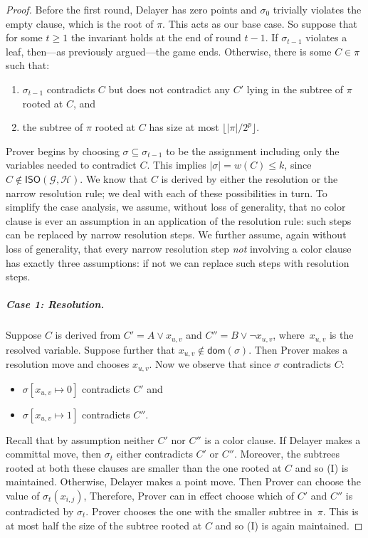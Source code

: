 \documentclass[a4paper,english, thm-restate]{lipics-v2021}
\newcommand{\graphG}{\mathcal{G}}
\newcommand{\graphH}{\mathcal{H}}
\newcommand{\dom}{\mathsf{dom}}
\newcommand{\ISO}{\mathsf{ISO}(\graphG, \graphH)}
\begin{document}
\begin{proof}
Before the first round, Delayer has zero points and $\sigma_0$ trivially violates the empty clause, which is the root of $\pi$. This acts as our base case.
So suppose that for some $t \ge 1$ the invariant holds at the end of round $t-1$. If $\sigma_{t-1}$ violates a leaf, then---as previously argued---the game ends. Otherwise, there is some $C \in \pi$ such that:
\begin{enumerate}
\item $\sigma_{t-1}$ contradicts $C$ but does not contradict any $C'$ lying in the subtree of $\pi$ rooted at $C$, and
\item the subtree of $\pi$ rooted at $C$ has size at most $\lfloor |\pi| / 2^p \rfloor$.
\end{enumerate} 
Prover begins by choosing $\sigma \subseteq \sigma_{t-1}$ to be the assignment including only the variables needed to contradict $C$. This implies $|\sigma| = w(C) \le k$, since $C \not \in \ISO$. We know that $C$ is derived by either the resolution or the narrow resolution rule; we deal with each of these possibilities in turn.
To simplify the case analysis, we assume, without loss of generality,
that no color clause is ever an assumption in an application of the
resolution rule: such steps can be replaced by narrow resolution
steps. We further assume, again without loss of generality, that every
narrow resolution step \emph{not} involving a color clause has exactly
three assumptions: if not we can replace such steps with resolution
steps.


\subparagraph{Case 1: Resolution.} Suppose $C$ is derived from $C'= A \vee x_{u,v}$ and $C''= B \vee \neg x_{u,v}$, where~$x_{u,v}$ is the resolved variable. Suppose further that $x_{u,v} \not \in \dom(\sigma)$.
Then Prover makes a resolution move and chooses $x_{u,v}$. Now we observe that since $\sigma$ contradicts $C$:
\begin{itemize}
\item $\sigma[x_{u,v} \mapsto 0]$ contradicts $C'$ and
\item $\sigma[x_{u,v} \mapsto 1]$ contradicts $C''$.
\end{itemize}
%
Recall that by assumption neither $C'$ nor $C''$ is a color clause. If Delayer makes a committal move, then $\sigma_t$ either contradicts $C'$ or $C''$. Moreover, the subtrees rooted at both these clauses are smaller than the one rooted at $C$ and so (I) is maintained. Otherwise, Delayer makes a point move. Then Prover can choose the value of $\sigma_t(x_{i,j})$, Therefore, Prover can in effect choose which of $C'$ and $C''$ is contradicted by $\sigma_t$. Prover chooses the one with the smaller subtree in~$\pi$. This is at most half the size of the subtree rooted at $C$ and so (I) is again maintained.


\end{proof}
\end{document}
